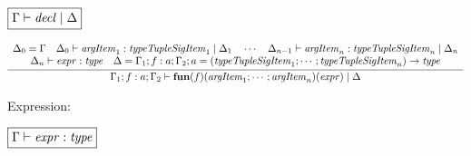 $\fbox{$\Gamma \vdash \mathit{decl} \mid \Delta$}$

\begin{gather*}
  \infer{\Gamma_1; f: a; \Gamma_2 \vdash \mathbf{fun}(f)(\mathit{argItem}_1; \cdots; \mathit{argItem}_n)(\mathit{expr}) \mid \Delta}{
    \begin{array}{c}
      \Delta_0 = \Gamma
      \hspace{1em}
      \Delta_0 \vdash \mathit{argItem}_1: \mathit{typeTupleSigItem}_1 \mid \Delta_1
      \hspace{1em}
      \cdots
      \hspace{1em}
      \Delta_{n - 1} \vdash \mathit{argItem}_n: \mathit{typeTupleSigItem}_n \mid \Delta_n
      \\
      \Delta_n \vdash \mathit{expr}: \mathit{type}
      \hspace{1em}
      \Delta = \Gamma_1; f: a; \Gamma_2; a = (\mathit{typeTupleSigItem}_1; \cdots; \mathit{typeTupleSigItem}_n) \rightarrow \mathit{type}
    \end{array}
  }
\end{gather*}

Expression:

$\fbox{$\Gamma \vdash \mathit{expr}: \mathit{type}$}$

